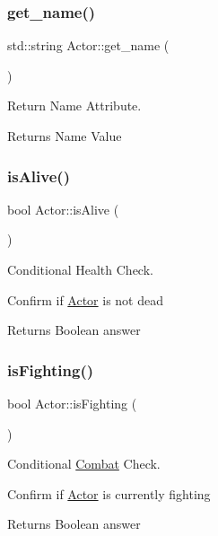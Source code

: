 \subsubsection{\texorpdfstring{get\+\_\+name()}{get\_name()}}
{\footnotesize\ttfamily std\+::string Actor\+::get\+\_\+name (\begin{DoxyParamCaption}{ }\end{DoxyParamCaption})}



Return Name Attribute. 

\begin{DoxyReturn}{Returns}
Name Value 
\end{DoxyReturn}
\mbox{\label{classActor_aee8e4efcd61cfc994a232730d89a4fef}} 
\subsubsection{\texorpdfstring{is\+Alive()}{isAlive()}}
{\footnotesize\ttfamily bool Actor\+::is\+Alive (\begin{DoxyParamCaption}{ }\end{DoxyParamCaption})}



Conditional Health Check. 

Confirm if \mbox{\hyperlink{classActor}{Actor}} is not dead \begin{DoxyReturn}{Returns}
Boolean answer 
\end{DoxyReturn}
\mbox{\label{classActor_a8836e8c2b76103a8dc47ff408d89ce3e}} 
\subsubsection{\texorpdfstring{is\+Fighting()}{isFighting()}}
{\footnotesize\ttfamily bool Actor\+::is\+Fighting (\begin{DoxyParamCaption}{ }\end{DoxyParamCaption})}



Conditional \mbox{\hyperlink{classCombat}{Combat}} Check. 

Confirm if \mbox{\hyperlink{classActor}{Actor}} is currently fighting \begin{DoxyReturn}{Returns}
Boolean answer 
\end{DoxyReturn}
\mbox{\label{classActor_a252bc0e75933e7e3062d54b8e1f8fafb}} 
